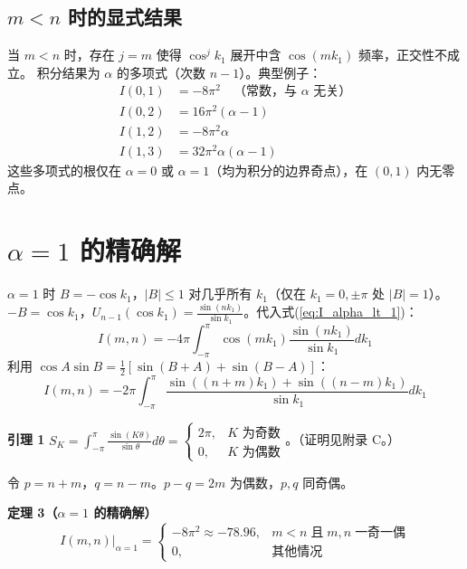 \documentclass[12pt,a4paper]{ctexart}
\begin{document}
\subsection{$m<n$ 时的显式结果}

当 $m<n$ 时，存在 $j=m$ 使得 $\cos^j k_1$ 展开中含 $\cos(mk_1)$ 频率，正交性不成立。
积分结果为 $\alpha$ 的多项式（次数 $n-1$）。典型例子：
\begin{equation}\label{eq:examples}
\begin{aligned}
I(0,1)&=-8\pi^2 \quad\text{（常数，与 $\alpha$ 无关）}\\
I(0,2)&=16\pi^2(\alpha-1)\\
I(1,2)&=-8\pi^2\alpha\\
I(1,3)&=32\pi^2\alpha(\alpha-1)
\end{aligned}
\end{equation}
这些多项式的根仅在 $\alpha=0$ 或 $\alpha=1$（均为积分的边界奇点），在 $(0,1)$ 内无零点。

\section{$\alpha=1$ 的精确解}

$\alpha=1$ 时 $B=-\cos k_1$，$|B|\leq1$ 对几乎所有 $k_1$（仅在 $k_1=0,\pm\pi$ 处 $|B|=1$）。
$-B=\cos k_1$，$U_{n-1}(\cos k_1)=\frac{\sin(nk_1)}{\sin k_1}$。代入式(\ref{eq:I_alpha_lt_1})：
\begin{equation}
I(m,n)=-4\pi\int_{-\pi}^{\pi}\cos(mk_1)\frac{\sin(nk_1)}{\sin k_1}dk_1
\end{equation}
利用 $\cos A\sin B=\frac12[\sin(B+A)+\sin(B-A)]$：
\begin{equation}
I(m,n)=-2\pi\!\int_{-\pi}^{\pi}\frac{\sin((n+m)k_1)+\sin((n-m)k_1)}{\sin k_1}dk_1
\end{equation}

\textbf{引理 1} $\displaystyle S_K=\int_{-\pi}^{\pi}\frac{\sin(K\theta)}{\sin\theta}d\theta=
\begin{cases}2\pi,&K\text{ 为奇数}\\0,&K\text{ 为偶数}\end{cases}$。（证明见附录 C。）

令 $p=n+m$，$q=n-m$。$p-q=2m$ 为偶数，$p,q$ 同奇偶。

\textbf{定理 3（$\alpha=1$ 的精确解）}
\begin{equation}\label{eq:thm3}
\boxed{I(m,n)\big|_{\alpha=1}=
\begin{cases}
-8\pi^2\approx-78.96, & m<n\;\text{且}\;m,n\;\text{一奇一偶}\\[4pt]
0, & \text{其他情况}
\end{cases}}
\end{equation}
\end{document}
